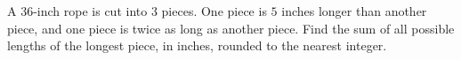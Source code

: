 A $36$-inch rope is cut into $3$ pieces. One piece is $5$ inches longer than another piece, and one piece is twice as long as another piece. Find the sum of all possible lengths of the longest piece, in inches, rounded to the nearest integer.
